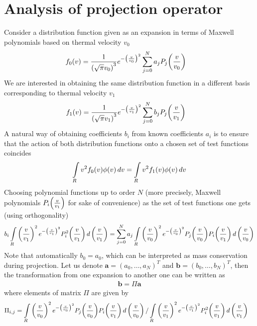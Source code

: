 \documentclass{article}
\newcommand{\myint}{\int\limits}
\newcommand{\diff}[1]{\, d#1}
\newcommand{\vect}[1]{\mathbf{#1}}
\newcommand{\of}[1]{\mleft( #1 \mright)}
\begin{document}
\section{Analysis of projection operator}
Consider a distribution function given as an expansion in terms of Maxwell polynomials based on thermal velocity $v_0$
\begin{align*}
f_0\of{v} &= \frac{1}{\left( \sqrt{\pi} v_0 \right)^3} e^{-\left( \frac{v}{v_0} \right)^2} \sum_{j=0}^{N} a_j P_j\of{\frac{v}{v_0}}
\end{align*}
We are interested in obtaining the same distribution function in a different basis corresponding to thermal velocity $v_1$
\begin{align*}
f_1 \of{v} &= \frac{1}{\left( \sqrt{\pi} v_1 \right)^3} e^{-\left( \frac{v}{v_1} \right)^2} \sum_{j=0}^{N} b_j P_j\of{\frac{v}{v_1}}
\end{align*}
A natural way of obtaining coefficients $b_i$ from known coefficients $a_i$ is to ensure that the action of both distribution functions onto a chosen set of test functions coincides
\begin{align*}
\myint_{R} {v}^2 f_0\of{v} \phi\of{v} \diff{v} = 
\myint_{R} {v}^2 f_1\of{v} \phi\of{v} \diff{v}
\end{align*}
Choosing polynomial functions up to order $N$ (more precisely, Maxwell polynomials $P_i\of{\frac{v}{v_1}}$ for sake of convenience) as the set of test functions one gets (using orthogonality)
\begin{align*}
b_i \myint_{R} \left( \frac{v}{v_1} \right)^2 e^{-\left( \frac{v}{v_1} \right)^2} P^2_i\of{\frac{v}{v_1}} \diff{\left(\frac{v}{v_1}\right)} = 
\sum_{j=0}^{N} a_j
\myint_{R} \left( \frac{v}{v_0} \right)^2 e^{-\left( \frac{v}{v_0} \right)^2}  P_j\of{\frac{v}{v_0}} P_i\of{\frac{v}{v_1}} \diff{\left(\frac{v}{v_0}\right)} 
\end{align*}
Note that automatically $b_0 = a_0$, which can be interpreted as mass conservation during projection. 
Let us denote $\vect{a} = \left( a_0,\ldots, a_N \right)^T$ and $\vect{b} = \left( b_0,\ldots, b_N \right)^T$, then the transformation from one expansion to another one can be written as 
\begin{align*}
\vect{b} = \Pi \vect{a}
\end{align*}
where elements of matrix $\Pi$ are given by
\begin{align*}
\Pi_{i,j} &= \myint_{R} \left( \frac{v}{v_0} \right)^2 e^{-\left( \frac{v}{v_0} \right)^2} P_j\of{\frac{v}{v_0}} P_i\of{\frac{v}{v_1}} \diff{\left(\frac{v}{v_0}\right)} 
/ 
\myint_{R} \left( \frac{v}{v_1} \right)^2 e^{-\left( \frac{v}{v_1} \right)^2} P^2_i\of{\frac{v}{v_1}} \diff{\left(\frac{v}{v_1}\right)}
\end{align*}
\end{document}
